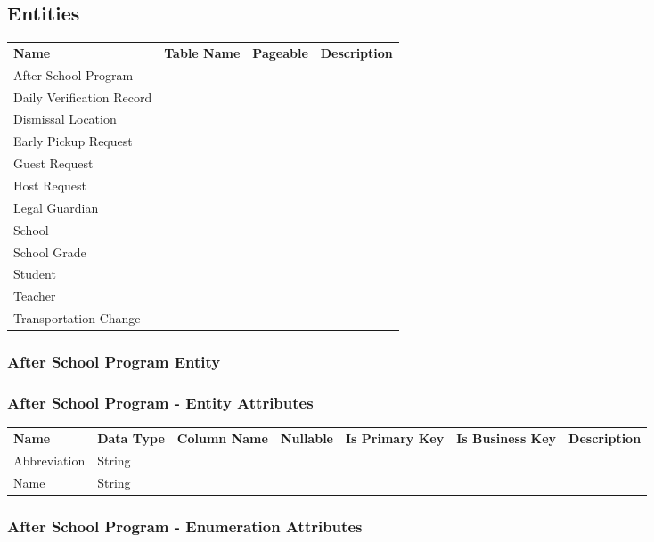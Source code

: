\subsection{Entities}

\begin{tabular}{lccc}
\bfseries Name & \bfseries Table Name & \bfseries Pageable & \bfseries Description\\
After School Program &  &  & \\
Daily Verification Record &  &  & \\
Dismissal Location &  &  & \\
Early Pickup Request &  &  & \\
Guest Request &  &  & \\
Host Request &  &  & \\
Legal Guardian &  &  & \\
School &  &  & \\
School Grade &  &  & \\
Student &  &  & \\
Teacher &  &  & \\
Transportation Change &  &  & \\
\end{tabular}



\subsubsection{ After School Program Entity }

\subsubsection*{ After School Program - Entity Attributes }

\begin{tabular}{lllcccl}
\bfseries Name & \bfseries Data Type & \bfseries Column Name & \bfseries Nullable & \bfseries Is Primary Key & \bfseries Is Business Key & \bfseries Description\\
Abbreviation & String &  &  &  &  &  \\
Name & String &  &  &  &  &  \\
\end{tabular}

\subsubsection*{ After School Program - Enumeration Attributes}

